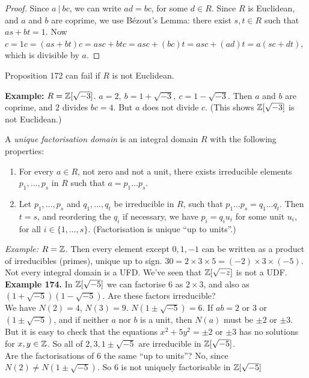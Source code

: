  \begin{proof}
 Since $a ~|~ bc$, we can write $ad = bc$, for some $d \in R$. Since $R$ is Euclidean, and $a$ and $b$ are coprime, we use B\'{e}zout's Lemma: there exist $s,t \in R$ such that $as + bt = 1$. Now $c = 1c = (as + bt)c = asc + btc = asc + (bc)t = asc + (ad)t = a(sc + dt)$, which is divisible by $a$. 
 \end{proof}\vspace*{5pt}
 
 Proposition 172 can fail if $R$ is not Euclidean.
 
 \textbf{Example:} $R = \mathbb{Z}[\sqrt{-3}]$. $a = 2, ~b = 1 + \sqrt{-3},~ c = 1-\sqrt{-3}$. Then $a$ and $b$ are coprime, and $2$ divides $bc = 4$. But $a$ does not divide $c$. (This shows $\mathbb{Z}[\sqrt{-3}]$ is not Euclidean.)\\
 
 \begin{definition} A \emph{unique factorisation domain} is an integral domain $R$ with the following properties:\begin{enumerate}
\item For every $a \in R$, not zero and not a unit, there exists irreducible elements $p_1,\dots,p_s$ in $R$ such that $a = p_1\dots p_s$.
\item Let $p_1,\dots,p_s$ and $q_1,\dots,q_t$ be irreducible in $R$, such that $p_1\dots p_s = q_1\dots q_t$. Then $t = s$, and reordering the $q_i$ if necessary, we have $p_i = q_iu_i$ for some unit $u_i$, for all $i \in \{1,\dots,s\}$. (Factorisation is unique ``up to units''.)
\end{enumerate} \end{definition}

\textit{Example:} $R = \mathbb{Z}$. Then every element except $0,1,-1$ can be written as a product of irreducibles (primes), unique up to sign. $30 = 2\times 3 \times 5 = (-2) \times 3 \times (-5)$.\\

  
\noindent Not   
 every integral domain is a UFD. We've seen that $\mathbb{Z}[\sqrt{-z}]$ is not a UDF.\\
  
  \noindent \textbf{Example 174.} In $\mathbb{Z}[\sqrt{-5}]$ we can factorise $6$ as $2\times 3$, and also as $(1 + \sqrt{-5})(1-\sqrt{-5})$. Are these factors irreducible?\vspace*{5pt}\\ We have $N(2) = 4$, $N(3) = 9$. $N(1 \pm \sqrt{-5}) = 6$. If $ab = 2$ or $3$ or $(1 \pm \sqrt{-5})$, and if neither $a$ nor $b$ is a unit, then $N(a)$ must be $\pm 2$ or $\pm 3$. But it is easy to check that the equations $x^2 + 5y^2 = \pm 2$ or $\pm 3$ has no solutions for $x,y \in \mathbb{Z}$. So all of $2,3,1\pm \sqrt{-5}$ are irreducible in $\mathbb{Z}[\sqrt{-5}]$. \vspace*{5pt}\\ Are the factorisations of $6$ the same ``up to units''? No, since $N(2) \neq N(1 \pm \sqrt{-5})$. So $6$ is not uniquely factorisable in $\mathbb{Z}[\sqrt{-5}]$\\
  
